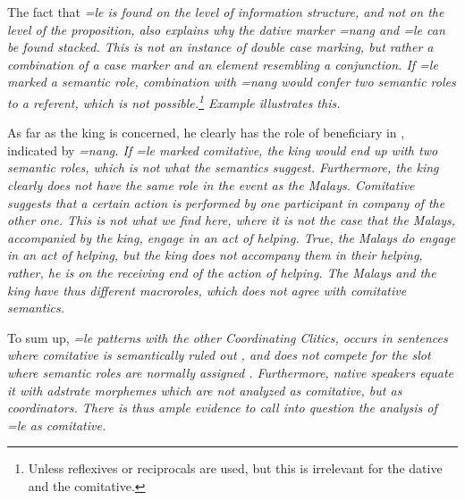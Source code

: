 The fact that \em =le \em is found on the level of information structure, and not on the level of the proposition,  also explains why the dative marker \em =nang \em and \em =le \em can be found stacked. This is not an instance of double case marking, but rather a combination of a case marker and an element resembling a conjunction. If \em =le \em marked a semantic role, combination with \em =nang \em would confer two semantic roles to a referent, which is not possible.\footnote{Unless reflexives or reciprocals are used, but this is irrelevant for the dative and the comitative.} Example  illustrates this.
 

As far as the king is concerned, he clearly has the role of beneficiary in , indicated by \em =nang\em. If \em =le \em marked comitative, the king would end up with two semantic roles, which is not what the semantics suggest. Furthermore, the king clearly does not have the same role in the event as the Malays. Comitative suggests that a certain action is performed by one participant in company of the other one. This is not what we find here, where it is not the case that the Malays, accompanied by the king, engage in an act of helping. True, the Malays do engage in an act of helping, but the king does not accompany them in their helping, rather, he is on the receiving end of the action of helping. The Malays and the king have thus different macroroles, which does not agree with comitative semantics.

To sum up, \em =le \em patterns with the other Coordinating Clitics, occurs in sentences where comitative is semantically ruled out , and does not compete for the slot where semantic roles are normally assigned . Furthermore, native speakers equate it with adstrate morphemes which are not analyzed as comitative, but as coordinators. There is thus ample evidence to call into question the analysis of \em =le \em as comitative.

